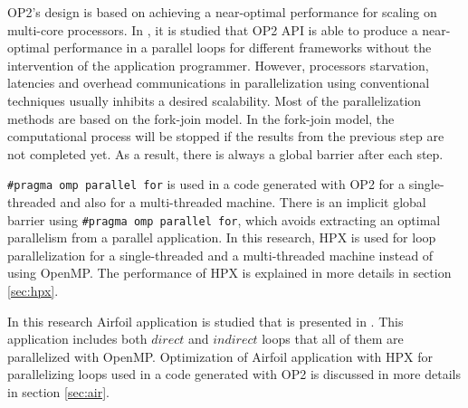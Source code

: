 \documentclass[conference]{IEEEtran}
\begin{document}
OP2's design is based on achieving a near-optimal performance for scaling on multi-core processors. In \cite{o3,o4}, it is studied that OP2 API is able to produce a near-optimal performance in a parallel loops for different frameworks without the intervention of the application programmer. However, processors starvation, latencies and overhead communications in parallelization using conventional techniques usually inhibits a desired scalability. Most of the parallelization methods are based on the fork-join model. In the fork-join model, the computational process will be stopped if the results from the previous step are not completed yet. As a result, there is always a global barrier after each step. 

\texttt{\#pragma omp parallel for} is used in a code generated with OP2 for a single-threaded and also for a multi-threaded machine. There is an implicit global barrier using \texttt{\#pragma omp parallel for}, which avoids extracting an optimal parallelism from a parallel application. In this research, HPX is used for loop parallelization for a single-threaded and a multi-threaded machine instead of using OpenMP. The performance of HPX is explained in more details in section \ref{sec:hpx}.                                                                                                                                                                                                                                                                                                                                                                                                                                                                                                                                                                                                                                                                                                                                                                                                                            


In this research Airfoil application is studied that is presented in \cite{o8}. This application includes both $direct$ and $indirect$ loops that all of them are parallelized with OpenMP. Optimization of Airfoil application with HPX for parallelizing loops used in a code generated with OP2 is discussed in more details in section \ref{sec:air}.                                                                                                                                                                                                                                      
\end{document}
